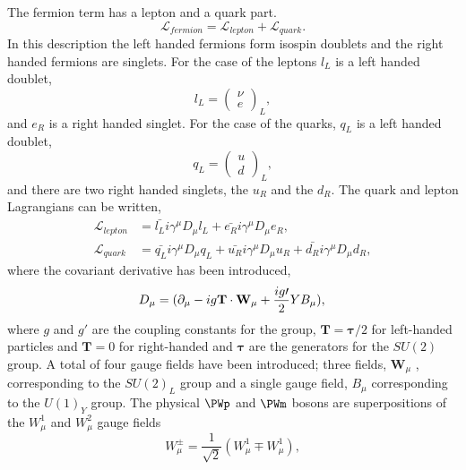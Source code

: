 The fermion term has a lepton and a quark part.
\begin{equation}
\mathcal{L}_{fermion} =
 \mathcal{L}_{lepton}
+ \mathcal{L}_{quark}.
\end{equation}
In this description the left handed fermions form isospin doublets and the right
handed fermions are singlets. For the case of the leptons $l_{L}$ is a left
handed doublet,
\begin{equation}
l_{L} = \left( \begin{matrix} \nu \\ e \end{matrix} \right)_{L},
\end{equation}
and $e_{R}$ is a right handed singlet.
For the case of the quarks, $q_{L}$ is a left handed doublet,
\begin{equation}
q_{L} = \left( \begin{matrix} u\\ d \end{matrix} \right)_{L},
\end{equation}
and there are two right handed singlets, the $u_{R}$ and the $d_{R}$.
The quark and lepton Lagrangians can be written,
\begin{align*}
\mathcal{L}_{lepton} &= 
\bar{l_{L}} i \gamma^{\mu} D_{\mu} l_{L} +
\bar{e_{R}} i \gamma^{\mu} D_{\mu} e_{R}, \\
\mathcal{L}_{quark} &= 
\bar{q_{L}} i \gamma^{\mu} D_{\mu} q_{L} +
\bar{u_{R}} i \gamma^{\mu} D_{\mu} u_{R} +
\bar{d_{R}} i \gamma^{\mu} D_{\mu} d_{R},
\end{align*}
where the covariant derivative has been introduced,
\begin{equation}
D_{\mu}
= (\partial_{\mu} 
- ig \mathbf{T} \cdot \mathbf{W}_{\mu}
+ \frac{ig\prime}{2} Y B_{\mu} ) ,\\
\end{equation}
where $g$ and $g\prime$ are the coupling constants for the group,
$\mathbf{T}=\mathbf{\tau}/2$ for left-handed particles and 
$\mathbf{T}=0$ for right-handed and $\mathbf{\tau}$
are the generators for the $SU(2)$ group. A total of four gauge fields have been
introduced; three fields, $\mathbf{W}_{\mu}$ , corresponding to the $SU(2)_{L}$
group and a single gauge field, $B_{\mu}$ corresponding to the $U(1)_{Y}$ group.
The physical $\PWp$ and $\PWm$ bosons are superpositions of the $W^{1}_{\mu}$
and $W^{2}_{\mu}$ gauge fields
\begin{equation}
W^{\pm}_{\mu} = \frac{1}{\sqrt{2}} \left(W^{1}_{\mu} \mp W^{1}_{\mu}\right),
\label{eq:wgauge}
\end{equation}
